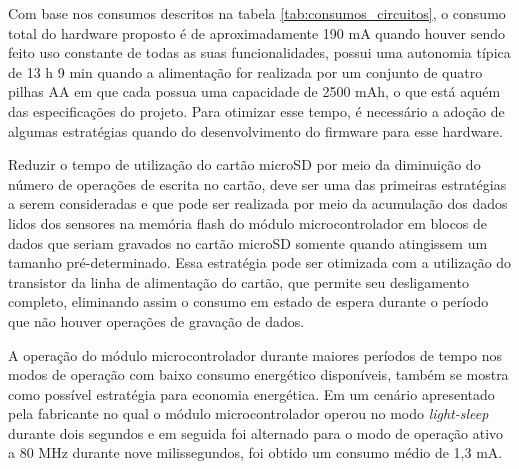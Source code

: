 Com base nos consumos descritos na tabela \ref{tab:consumos_circuitos}, o consumo total do hardware proposto é de aproximadamente 190 mA quando houver sendo feito uso constante de todas as suas funcionalidades, possui uma autonomia típica de 13 h 9 min quando a alimentação for realizada por um conjunto de quatro pilhas AA em que cada possua uma capacidade de 2500 mAh, o que está aquém das especificações do projeto. Para otimizar esse tempo, é necessário a adoção de algumas estratégias quando do desenvolvimento do firmware para esse hardware.

Reduzir o tempo de utilização do cartão microSD por meio da diminuição do número de operações de escrita no cartão, deve ser uma das primeiras estratégias a serem consideradas e que pode ser realizada por meio da acumulação dos dados lidos dos sensores na memória flash do módulo microcontrolador em blocos de dados que seriam gravados no cartão microSD somente quando atingissem um tamanho pré-determinado. Essa estratégia pode ser otimizada com a utilização do transistor da linha de alimentação do cartão, que permite seu desligamento completo, eliminando assim o consumo em estado de espera durante o período que não houver operações de gravação de dados. 

A operação do módulo microcontrolador durante maiores períodos de tempo nos modos de operação com baixo consumo energético disponíveis, também se mostra como possível estratégia para economia energética. Em um cenário apresentado pela fabricante  no qual o módulo microcontrolador operou no modo \textit{light-sleep} durante dois segundos e em seguida foi alternado para o modo de operação ativo a 80 MHz durante nove milissegundos, foi obtido um consumo médio de 1,3 mA.








    
